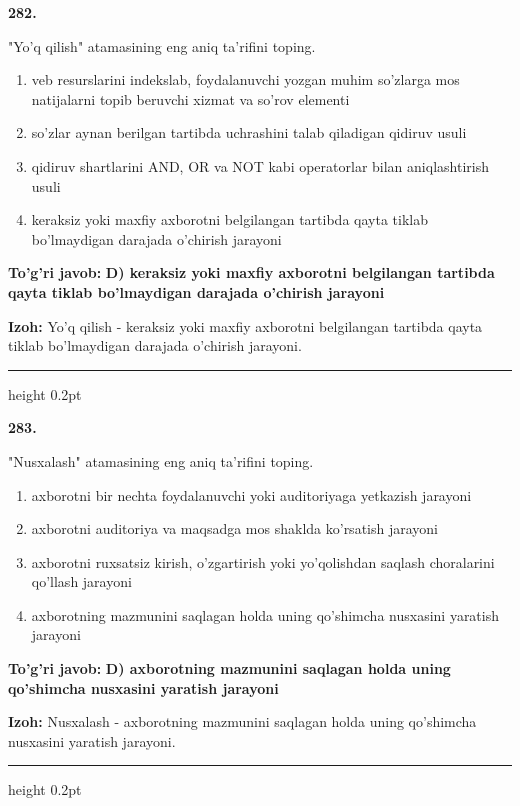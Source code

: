 \documentclass[10pt,a4paper,oneside]{article}
\begin{document}
\noindent\textbf{\color{ink}282.}
\par
"Yo'q qilish" atamasining eng aniq ta'rifini toping.
\begin{enumerate}[label=\Alph*),leftmargin=9mm]
\item veb resurslarini indekslab, foydalanuvchi yozgan muhim so'zlarga mos natijalarni topib beruvchi xizmat va so'rov elementi
\item so'zlar aynan berilgan tartibda uchrashini talab qiladigan qidiruv usuli
\item qidiruv shartlarini AND, OR va NOT kabi operatorlar bilan aniqlashtirish usuli
\item keraksiz yoki maxfiy axborotni belgilangan tartibda qayta tiklab bo'lmaydigan darajada o'chirish jarayoni
\end{enumerate}
\begin{tcolorbox}[enhanced,breakable,colback=teal!4,colframe=teal!50!black,boxrule=0.5pt,arc=1.1mm,left=3mm,right=3mm,top=1.7mm,bottom=1.7mm,before skip=2mm,after skip=2mm]
\textbf{\color{teal}To'g'ri javob:} \textbf{D) keraksiz yoki maxfiy axborotni belgilangan tartibda qayta tiklab bo'lmaydigan darajada o'chirish jarayoni}
\par\smallskip
\textbf{Izoh:} Yo'q qilish - keraksiz yoki maxfiy axborotni belgilangan tartibda qayta tiklab bo'lmaydigan darajada o'chirish jarayoni.
\end{tcolorbox}
\vspace{2mm}\hrule height 0.2pt \vspace{3mm}

\noindent\textbf{\color{ink}283.}
\par
"Nusxalash" atamasining eng aniq ta'rifini toping.
\begin{enumerate}[label=\Alph*),leftmargin=9mm]
\item axborotni bir nechta foydalanuvchi yoki auditoriyaga yetkazish jarayoni
\item axborotni auditoriya va maqsadga mos shaklda ko'rsatish jarayoni
\item axborotni ruxsatsiz kirish, o'zgartirish yoki yo'qolishdan saqlash choralarini qo'llash jarayoni
\item axborotning mazmunini saqlagan holda uning qo'shimcha nusxasini yaratish jarayoni
\end{enumerate}
\begin{tcolorbox}[enhanced,breakable,colback=teal!4,colframe=teal!50!black,boxrule=0.5pt,arc=1.1mm,left=3mm,right=3mm,top=1.7mm,bottom=1.7mm,before skip=2mm,after skip=2mm]
\textbf{\color{teal}To'g'ri javob:} \textbf{D) axborotning mazmunini saqlagan holda uning qo'shimcha nusxasini yaratish jarayoni}
\par\smallskip
\textbf{Izoh:} Nusxalash - axborotning mazmunini saqlagan holda uning qo'shimcha nusxasini yaratish jarayoni.
\end{tcolorbox}
\vspace{2mm}\hrule height 0.2pt \vspace{3mm}
\end{document}
